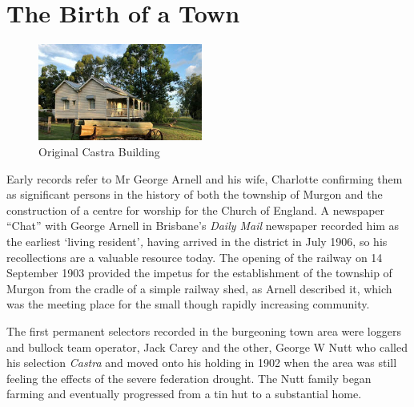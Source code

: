 \printendnotes[custom]
\setcounter{endnote}{0}
\chapter{The Birth of a Town}




\begin{figure}
\begin{center}
\includegraphics[width=0.48\textwidth,right]{images/castraOld.jpg}
\caption{Original Castra Building}
\end{center}
\end{figure}


Early records refer to Mr George Arnell and his wife, Charlotte
confirming them as significant persons in the history of both the
township of Murgon and the construction of a centre for worship for the
Church of England. A newspaper ``Chat'' with George Arnell in Brisbane's
\emph{Daily Mail} newspaper recorded him as the earliest `living
resident'\emph{,} having arrived in the district in July 1906, so his
recollections are a valuable resource today. The opening of the railway
on 14 September 1903 provided the impetus for the establishment of the
township of Murgon from the cradle of a simple railway shed, as Arnell
described it, which was the meeting place for the small though rapidly
increasing community.

The first permanent selectors recorded in the burgeoning town area were
loggers and bullock team operator, Jack Carey and the other, George W
Nutt who called his selection \emph{Castra} and moved onto his holding
in 1902 when the area was still feeling the effects of the severe
federation drought. The Nutt family began farming and eventually
progressed from a tin hut to a substantial home.

